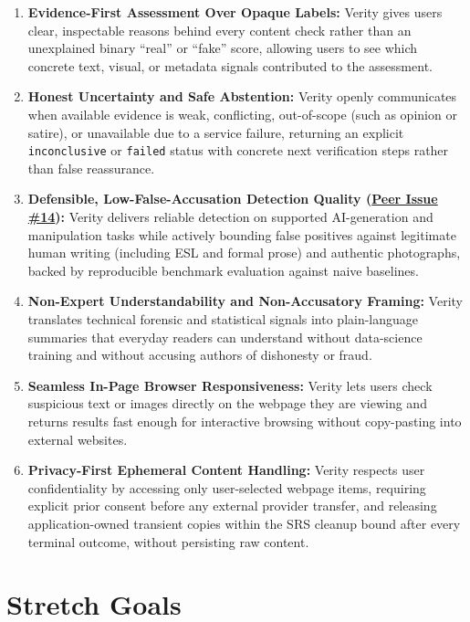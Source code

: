 \documentclass[11pt]{article}
\begin{document}
\begin{enumerate}[label=\textbf{G\arabic*.}, leftmargin=*]
    \item \textbf{Evidence-First Assessment Over Opaque Labels:} Verity gives users clear, inspectable reasons behind every content check rather than an unexplained binary ``real'' or ``fake'' score, allowing users to see which concrete text, visual, or metadata signals contributed to the assessment.
    \item \textbf{Honest Uncertainty and Safe Abstention:} Verity openly communicates when available evidence is weak, conflicting, out-of-scope (such as opinion or satire), or unavailable due to a service failure, returning an explicit \texttt{inconclusive} or \texttt{failed} status with concrete next verification steps rather than false reassurance.
    \item \textbf{Defensible, Low-False-Accusation Detection Quality (\href{https://github.com/richy1337/Verity/issues/14}{Peer Issue \#14}):} Verity delivers reliable detection on supported AI-generation and manipulation tasks while actively bounding false positives against legitimate human writing (including ESL and formal prose) and authentic photographs, backed by reproducible benchmark evaluation against naive baselines.
    \item \textbf{Non-Expert Understandability and Non-Accusatory Framing:} Verity translates technical forensic and statistical signals into plain-language summaries that everyday readers can understand without data-science training and without accusing authors of dishonesty or fraud.
    \item \textbf{Seamless In-Page Browser Responsiveness:} Verity lets users check suspicious text or images directly on the webpage they are viewing and returns results fast enough for interactive browsing without copy-pasting into external websites.
    \item \textbf{Privacy-First Ephemeral Content Handling:} Verity respects user confidentiality by accessing only user-selected webpage items, requiring explicit prior consent before any external provider transfer, and releasing application-owned transient copies within the SRS cleanup bound after every terminal outcome, without persisting raw content.
\end{enumerate}

\section{Stretch Goals}
\end{document}
